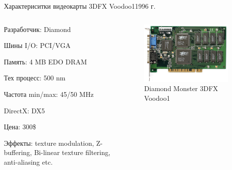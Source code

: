 \documentclass{beamer}
\begin{document}
\begin{frame}{Характериситки видеокарты 3DFX Voodoo1}{1996 г.}
	\begin{columns}
		\begin{column}{0.5\textwidth}
			Разработчик: Diamond
			
			Шины I/O: PCI/VGA
			
			Память: 4 MB EDO DRAM
			
			Тех процесс: 500 nm
			
			Частота min/max: 45/50 MHz
			
			DirectX: DX5
			
			Цена: 300\$
			
			Эффекты: texture modulation, Z-buffering, Bi-linear texture filtering, anti-aliasing etc.
		\end{column}
		\begin{column}{0.5\textwidth}
			\begin{figure} 
				\includegraphics[width=\textwidth]{images/Diamond_Monster_3D_3DFX_Voodoo1.png}
				\caption {Diamond Monster 3DFX Voodoo1}
			\end{figure}
			
		\end{column}
	\end{columns}
\end{frame}
\end{document}
